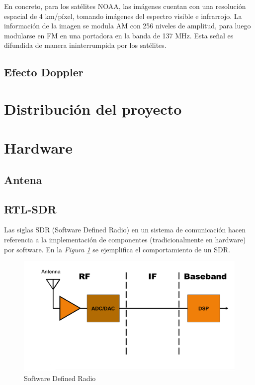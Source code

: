 \documentclass[a4paper,openright,12pt]{article}
\begin{document}
	En concreto, para los satélites NOAA, las imágenes cuentan con una resolución espacial de 4 km/píxel, tomando imágenes del espectro visible e infrarrojo. La información de la imagen se modula AM con 256 niveles de amplitud, para luego modularse en FM en una portadora en la banda de 137 MHz. Esta señal es difundida de manera ininterrumpida por los satélites.
	
	
	
	\subsection{Efecto Doppler}

\section{Distribución del proyecto}


\section{Hardware}

	\subsection{Antena}
	\subsection{RTL-SDR}
	Las siglas SDR (Software Defined Radio) en un sistema de comunicación hacen referencia a la implementación de componentes (tradicionalmente en hardware) por software. En la \textit{Figura \ref{SDR}} se ejemplifica el comportamiento de un SDR.
	
 \begin{figure}[hbtp]
 \centering
 \includegraphics[width = 12cm]{imagenes/sdr.jpg}
 \caption{Software Defined Radio}
 \label{SDR}
 \end{figure}
\end{document}
